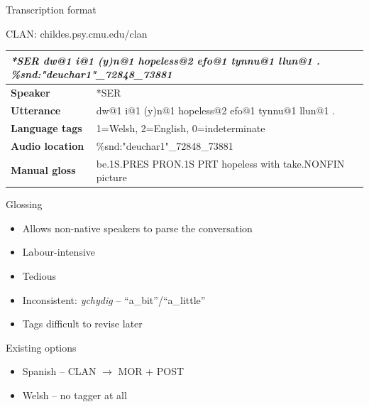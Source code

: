 \documentclass[hyperref={pdfpagelabels=false}, 14pt]{beamer}
\begin{document}
\begin{frame}{Transcription format \\ \begin{normalsize}CLAN: childes.psy.cmu.edu/clan \end{normalsize}}
\begin{center}
\begin{small}
\begin{tabular}{p{3cm}p{6cm}}
\multicolumn{2}{p{9cm}}{\textit{*SER dw@1 i@1 (y)n@1 hopeless@2 efo@1 tynnu@1 llun@1 . \%snd:"deuchar1"\_72848\_73881}} \\
\hline\noalign{\smallskip}
\textbf{Speaker} & *SER \\
\hline\noalign{\smallskip}
\textbf{Utterance} & \textcolor{ESRCblue}{dw@1 i@1 (y)n@1 hopeless@2 efo@1 tynnu@1 llun@1 .} \\
\hline\noalign{\smallskip}
\textbf{Language tags} & 1=Welsh, 2=English, 0=indeterminate \\
\hline\noalign{\smallskip}
\textbf{Audio location} & \%snd:"deuchar1"\_72848\_73881 \\
\hline\noalign{\smallskip}
\textcolor{ESRCred}{\textbf{Manual gloss}} & \textcolor{ESRCred}{be.1S.PRES PRON.1S PRT hopeless with take.NONFIN picture}
\end{tabular}
\end{small}
\end{center}
\end{frame}


\begin{frame}{Glossing}
\begin{itemize}
\item Allows non-native speakers to parse the conversation
\item Labour-intensive
\item Tedious
\item Inconsistent: \textit{ychydig} -- ``a\_bit''/``a\_little''
\item Tags difficult to revise later
\end{itemize}
\end{frame}


\begin{frame}{Existing options}
\begin{itemize}
\item Spanish -- CLAN $\rightarrow$ MOR + POST
\item Welsh -- no tagger at all
\end{itemize}
\end{frame}
\end{document}
